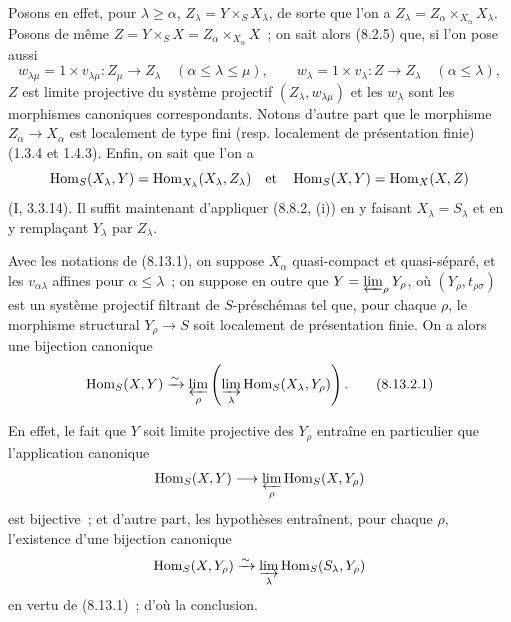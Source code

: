 Posons en effet, pour $\lambda\geqslant\alpha$,
$Z_\lambda=Y\times_S X_\lambda$, de sorte que l'on a
$Z_\lambda=Z_\alpha\times_{X_\alpha}X_\lambda$. Posons de même
$Z=Y\times_S X=Z_\alpha\times_{X_\alpha}X$~; on sait alors (8.2.5) que, si
l'on pose aussi
\[
w_{\lambda\mu}=1\times v_{\lambda\mu}:Z_\mu\to Z_\lambda
\quad(\alpha\leqslant\lambda\leqslant\mu),
\qquad
w_\lambda=1\times v_\lambda:Z\to Z_\lambda
\quad(\alpha\leqslant\lambda),
\]
$Z$ est limite projective du système projectif $(Z_\lambda,w_{\lambda\mu})$
et les $w_\lambda$ sont les morphismes canoniques correspondants. Notons
d'autre part que le morphisme $Z_\alpha\to X_\alpha$ est localement de type
fini (resp. localement de présentation finie) (1.3.4 et 1.4.3). Enfin, on
sait que l'on a
\[
\operatorname{Hom}_S(X_\lambda,Y)
=\operatorname{Hom}_{X_\lambda}(X_\lambda,Z_\lambda)
\quad\hbox{et}\quad
\operatorname{Hom}_S(X,Y)=\operatorname{Hom}_X(X,Z)
\]
(I, 3.3.14). Il suffit maintenant d'appliquer (8.8.2, (i)) en y faisant
$X_\lambda=S_\lambda$ et en y remplaçant $Y_\lambda$ par $Z_\lambda$.

\begin{corollary}[8.13.2]
\label{IV.8.13.2-fr}
Avec les notations de (8.13.1), on suppose $X_\alpha$ quasi-compact et
quasi-séparé, et les $v_{\alpha\lambda}$ affines pour
$\alpha\leqslant\lambda$~; on suppose en outre que
$Y=\varprojlim_\rho Y_\rho$, où $(Y_\rho,t_{\rho\sigma})$ est un système
projectif filtrant de $S$-préschémas tel que, pour chaque $\rho$, le morphisme
structural $Y_\rho\to S$ soit localement de présentation finie. On a alors une
bijection canonique
\begin{equation}
\label{IV.8.13.2.1-fr}
\operatorname{Hom}_S(X,Y)
\xrightarrow{\sim}
\varprojlim_\rho\left(\varinjlim_\lambda
\operatorname{Hom}_S(X_\lambda,Y_\rho)\right). \tag{8.13.2.1}
\end{equation}
\end{corollary}

En effet, le fait que $Y$ soit limite projective des $Y_\rho$ entraîne en
particulier que l'application canonique
\[
\operatorname{Hom}_S(X,Y)\longrightarrow
\varprojlim_\rho\operatorname{Hom}_S(X,Y_\rho)
\]
est bijective~; et d'autre part, les hypothèses entraînent, pour chaque
$\rho$, l'existence d'une bijection canonique
\[
\operatorname{Hom}_S(X,Y_\rho)\xrightarrow{\sim}
\varinjlim_\lambda\operatorname{Hom}_S(S_\lambda,Y_\rho)
\]
en vertu de (8.13.1)~; d'où la conclusion.

